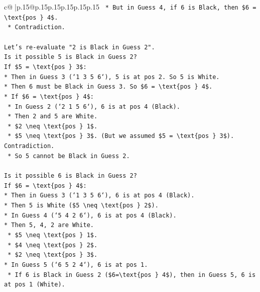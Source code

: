 \documentclass{article}
\begin{document}
{\begin{supertabular}{c@{$\;$}|p{.15\linewidth}@{}p{.15\linewidth}p{.15\linewidth}p{.15\linewidth}p{.15\linewidth}p{.15\linewidth}}
{{{\texttt{        *   But in Guess 4, if 6 is Black, then \$6 = \textbackslash{}text\{pos \} 4\$.} \\
\texttt{        *   Contradiction.} \\
\\ 
\texttt{Let's re{-}evaluate "2 is Black in Guess 2".} \\
\texttt{Is it possible 5 is Black in Guess 2?} \\
\texttt{If \$5 = \textbackslash{}text\{pos \} 3\$:} \\
\texttt{*   Then in Guess 3 (`1 3 5 6`), 5 is at pos 2. So 5 is White.} \\
\texttt{*   Then 6 must be Black in Guess 3. So \$6 = \textbackslash{}text\{pos \} 4\$.} \\
\texttt{*   If \$6 = \textbackslash{}text\{pos \} 4\$:} \\
\texttt{    *   In Guess 2 (`2 1 5 6`), 6 is at pos 4 (Black).} \\
\texttt{    *   Then 2 and 5 are White.} \\
\texttt{    *   \$2 \textbackslash{}neq \textbackslash{}text\{pos \} 1\$.} \\
\texttt{    *   \$5 \textbackslash{}neq \textbackslash{}text\{pos \} 3\$. (But we assumed \$5 = \textbackslash{}text\{pos \} 3\$). Contradiction.} \\
\texttt{    *   So 5 cannot be Black in Guess 2.} \\
\\ 
\texttt{Is it possible 6 is Black in Guess 2?} \\
\texttt{If \$6 = \textbackslash{}text\{pos \} 4\$:} \\
\texttt{*   Then in Guess 3 (`1 3 5 6`), 6 is at pos 4 (Black).} \\
\texttt{*   Then 5 is White (\$5 \textbackslash{}neq \textbackslash{}text\{pos \} 2\$).} \\
\texttt{*   In Guess 4 (`5 4 2 6`), 6 is at pos 4 (Black).} \\
\texttt{*   Then 5, 4, 2 are White.} \\
\texttt{    *   \$5 \textbackslash{}neq \textbackslash{}text\{pos \} 1\$.} \\
\texttt{    *   \$4 \textbackslash{}neq \textbackslash{}text\{pos \} 2\$.} \\
\texttt{    *   \$2 \textbackslash{}neq \textbackslash{}text\{pos \} 3\$.} \\
\texttt{*   In Guess 5 (`6 5 2 4`), 6 is at pos 1.} \\
\texttt{    *   If 6 is Black in Guess 2 (\$6=\textbackslash{}text\{pos \} 4\$), then in Guess 5, 6 is at pos 1 (White).} \\
}}}
\end{supertabular}}
\end{document}
